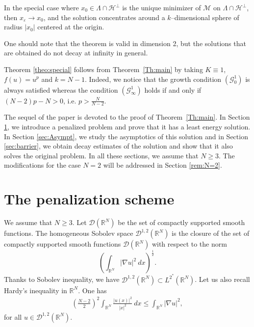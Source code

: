 \documentclass[a4paper]{amsart}
\begin{document}
In the special case where $x_0 \in \Lambda \cap \mathcal{H}^\perp$ is the unique minimizer of $\mathcal{M}$ on $\Lambda \cap \mathcal{H}^\perp$, then $x_\varepsilon \to x_0$, and the solution concentrates around a
$k$--dimensional sphere of radius ${\left| {x_0} \right|}$ centered at the origin.

One should note that the theorem is valid in dimension 2, but the solutions that are obtained do not decay at infinity in general.

Theorem \ref{theo:special} follows from Theorem~\ref{Th:main} by taking $K \equiv 1$, $f(u) = u^p$ and $k=N-1$. Indeed, we notice that the growth condition $(\mathcal{G}_{0}^1)$ is always satisfied whereas the condition $(\mathcal{G}_{\infty}^1)$ holds if
and only if $(N-2)p - N > 0$, i.e. $p>\frac{N}{N-2}$.

The sequel of the paper is devoted to the proof of Theorem~\ref{Th:main}. In Section \ref{sec:Penal}, we introduce a penalized
problem and prove that it has a least energy solution. In Section \ref{sec:Asympt}, we study the asymptotics of
this solution and in Section \ref{sec:barrier}, we obtain decay estimates of the solution and show that it also solves
the original problem. In all these sections, we assume that $N\geq 3$. The modifications for the case $N=2$ will be addressed
in Section \ref{rem:N=2}.

\section{The penalization scheme}\label{sec:Penal}

We assume that $N\geq 3$. Let $\mathcal{D}({\mathbb{R}}^N)$ be the set of compactly supported smooth functions. The homogeneous
Sobolev space $\mathcal{D}^{1,2}({\mathbb{R}}^N)$ is the closure of the set of compactly supported smooth functions $\mathcal{D}({\mathbb{R}}^N)$ with respect to the norm 
\[
\left( \int_{{\mathbb{R}}^N}
{\left| {\nabla u} \right|}^2\: dx \right)^{\frac{1}{2}}. 
\]
Thanks to Sobolev inequality, we have $\mathcal{D}^{1,2}({\mathbb{R}}^N) \subset
L^{2^*}({\mathbb{R}}^N)$. Let us also recall Hardy's inequality in ${\mathbb{R}}^N$. One has
\begin{align*}
\left( \frac{N-2}{2} \right)^2 \int_{{\mathbb{R}}^N} \frac{{\left| {u(x)} \right|}^2}{{\left| {x} \right|}^2}\: dx \leq \int_{{\mathbb{R}}^N} {\left| {\nabla u} \right|}^2,
\end{align*}
for all $u \in \mathcal{D}^{1,2}({\mathbb{R}}^N)$.
\end{document}
